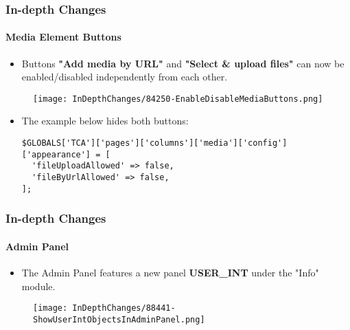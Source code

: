
\begin{frame}[fragile]
	\frametitle{In-depth Changes}
	\framesubtitle{Media Element Buttons}

	\lstset{basicstyle=\tiny\ttfamily}

	\begin{itemize}
		\item Buttons \textbf{"Add media by URL"} and \textbf{"Select \& upload files"}
			can now be enabled/disabled independently from each other.
	\end{itemize}

	\begin{figure}
		\texttt{[image: InDepthChanges/84250-EnableDisableMediaButtons.png]}
	\end{figure}

	\begin{itemize}
		\item The example below hides both buttons:
\begin{lstlisting}
$GLOBALS['TCA']['pages']['columns']['media']['config']['appearance'] = [
  'fileUploadAllowed' => false,
  'fileByUrlAllowed' => false,
];
\end{lstlisting}

	\end{itemize}

\end{frame}


\begin{frame}[fragile]
	\frametitle{In-depth Changes}
	\framesubtitle{Admin Panel}

	\begin{itemize}
		\item The Admin Panel features a new panel \textbf{USER\_INT} under the "Info" module.
	\end{itemize}

	\begin{figure}
		\texttt{[image: InDepthChanges/88441-ShowUserIntObjectsInAdminPanel.png]}
	\end{figure}

\end{frame}

